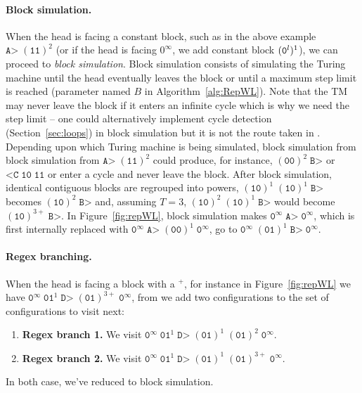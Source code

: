 \paragraph{Block simulation.} When the head is facing a constant block, such as in the above example $\texttt{A>} \; (\texttt{11})^2$ (or if the head is facing $0^\infty$, we add constant block $(\texttt{0}^l)^1$), we can proceed to \textit{block simulation}.
Block simulation consists of simulating the Turing machine until the head eventually leaves the block or until a maximum step limit is reached (parameter named $B$ in Algorithm~\ref{alg:RepWL}). Note that the TM may never leave the block if it enters an infinite cycle which is why we need the step limit -- one could alternatively implement cycle detection (Section~\ref{sec:loops}) in block simulation but it is not the route taken in \CoqBB. Depending upon which Turing machine is being simulated, block simulation from block simulation from $\texttt{A>} \; (\texttt{11})^2$ could produce, for instance, $(\texttt{00})^2 \; \texttt{B>}$ or $\texttt{<C} \; \texttt{10} \; \texttt{11} $ or enter a cycle and never leave the block. After block simulation, identical contiguous blocks are regrouped into powers, \eg $(\texttt{10})^1 \; (\texttt{10})^1 \; \texttt{B>}$ becomes $(\texttt{10})^2 \; \texttt{B>}$ and, assuming $T=3$, $(\texttt{10})^2\; (\texttt{10})^1\; \texttt{B>}$ would become $(\texttt{10})^{3+}\; \texttt{B>}$. In Figure~\ref{fig:repWL}, block simulation makes $\texttt{0}^\infty \; \texttt{A>} \; \texttt{0}^\infty$, which is first internally replaced with $\texttt{0}^\infty \; \texttt{A>} \; (\texttt{00})^1 \; \texttt{0}^\infty$, go to $\texttt{0}^\infty \; (\texttt{01})^1 \; \texttt{B>} \; \texttt{0}^\infty$.

\paragraph{Regex branching.} When the head is facing a block with a $^+$, for instance in Figure~\ref{fig:repWL} we have $\texttt{0}^\infty \; \texttt{01}^1 \; \texttt{D>} \; (\texttt{01})^{3+} \; \texttt{0}^\infty$, from we add two configurations to the set of configurations to visit next:
\begin{enumerate}
    \item \textbf{Regex branch 1.} We visit $\texttt{0}^\infty \; \texttt{01}^1 \; \texttt{D>} \; (\texttt{01})^1 \; (\texttt{01})^{2} \; \texttt{0}^\infty$.
    \item \textbf{Regex branch 2.} We visit $\texttt{0}^\infty \; \texttt{01}^1 \; \texttt{D>} \; (\texttt{01})^1 \; (\texttt{01})^{3+} \; \texttt{0}^\infty$.
\end{enumerate}
In both case, we've reduced to block simulation.

